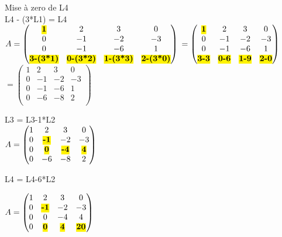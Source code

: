 \vspace{10mm} %

Mise à zero de L4 \\
L4 - (3*L1) = L4 \\

$
A =
\begin{pmatrix}
  \hl{\textbf{1}} & 2 & 3 & 0 \\
  0 & -1 & -2 & -3 \\
  0 & -1 & -6 & 1 \\
  \hl{\textbf{3-(3*1)}} & \hl{\textbf{0-(3*2)}} & \hl{\textbf{1-(3*3)}} & \hl{\textbf{2-(3*0)}} \\
\end{pmatrix}
$
$
=
\begin{pmatrix}
  \hl{\textbf{1}} & 2 & 3 & 0 \\
  0 & -1 & -2 & -3 \\
  0 & -1 & -6 & 1 \\
  \hl{\textbf{3-3}} & \hl{\textbf{0-6}} & \hl{\textbf{1-9}} & \hl{\textbf{2-0}} \\
\end{pmatrix}
$
$
=
\begin{pmatrix}
  1 & 2 & 3 & 0   \\
  0 & -1 & -2 & -3   \\
  0 & -1 & -6 & 1 \\
  0 & -6 & -8 & 2 \\
\end{pmatrix}
$

\newpage

L3 = L3-1*L2 \\

$
A =
\begin{pmatrix}
  1 & 2 & 3 & 0    \\
  0 & \hl{\textbf{-1}} & -2 & -3 \\
  0 & \hl{\textbf{0}} & \hl{\textbf{-4}} & \hl{\textbf{4}}   \\
  0 & -6 & -8 & 2  \\
\end{pmatrix}
$

\vspace{8mm} %
L4 = L4-6*L2 \\
\vspace{3mm} %

$
A =
\begin{pmatrix}
  1 & 2 & 3 & 0    \\
  0 & \hl{\textbf{-1}} & -2 & -3 \\
  0 & 0 & -4 & 4   \\
  0 & \hl{\textbf{0}} & \hl{\textbf{4}} & \hl{\textbf{20}}   \\
\end{pmatrix}
$

